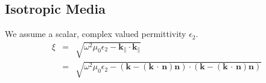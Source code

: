 \documentclass[12pt,a4paper,twoside,openright,BCOR10mm,headsepline,titlepage,abstracton,chapterprefix,final]{scrreprt}
\newcommand\Vector[1]{{\mathbf{#1}}}
\newcommand\vacuum{0}
\newcommand\wavenumber{k}
\newcommand\Wavevector{\Vector{\wavenumber}}
\newcommand{\scpm}[2]{(#1\,\cdot\,#2)}
\newcommand\vacuumpermeability{\mu_{\vacuum}}
\newcommand\scalarpermittivity{\epsilon}
\begin{document}
\subsection{Isotropic Media}
We assume a scalar, complex valued permittivity $\scalarpermittivity_2$.
\begin{eqnarray}
 \xi &=& \sqrt{\omega^2 \vacuumpermeability \scalarpermittivity_2 - \Wavevector_{\parallel} \cdot \Wavevector_{\parallel}} \nonumber\\
      &=& \sqrt{\omega^2 \vacuumpermeability \scalarpermittivity_2 - (\Wavevector - \scpm{\Wavevector}{\Vector{n}}\Vector{n}) \cdot (\Wavevector - \scpm{\Wavevector}{\Vector{n}}\Vector{n})}\\
\end{eqnarray}
\end{document}

